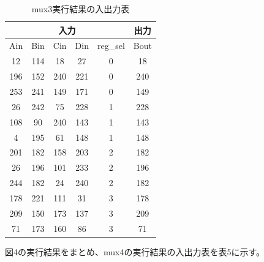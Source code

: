 \documentclass[12pt]{jreport}
\begin{document}
            \begin{table}[htb]
              \begin{center}
                \caption{mux3実行結果の入出力表}
                \begin{tabular} {|c|c|c|c|c|c|} \hline
                  \multicolumn{5}{|c|}{入力} & 出力 \\ \hline \hline
                        Ain & Bin & Cin & Din & reg\_sel & Bout \\ \hline
                        12 & 114 & 18 & 27 & 0 & 18 \\ \hline
                        196 & 152 & 240 & 221 & 0 & 240 \\ \hline
                        253 & 241 & 149 & 171 & 0 & 149 \\ \hline

                        26 & 242 & 75 & 228 & 1 & 228 \\ \hline
                        108 & 90 & 240 & 143 & 1 & 143 \\ \hline
                        4 &  195 & 61 & 148 & 1 & 148 \\ \hline

                        201 & 182 & 158 & 203 & 2 & 182 \\ \hline
                        26 & 196 & 101 & 233 & 2 & 196 \\ \hline
                        244 & 182 & 24 & 240 & 2 & 182 \\ \hline

                        178 & 221 & 111 & 31 & 3 & 178 \\ \hline
                        209 & 150 & 173 & 137 & 3 & 209 \\ \hline
                        71 & 173 & 160 & 86 & 3 & 71 \\ \hline

                \end{tabular}
              \end{center}
            \end{table}
            \newpage
            図4の実行結果をまとめ、mux4の実行結果の入出力表を表5に示す。
\end{document}
